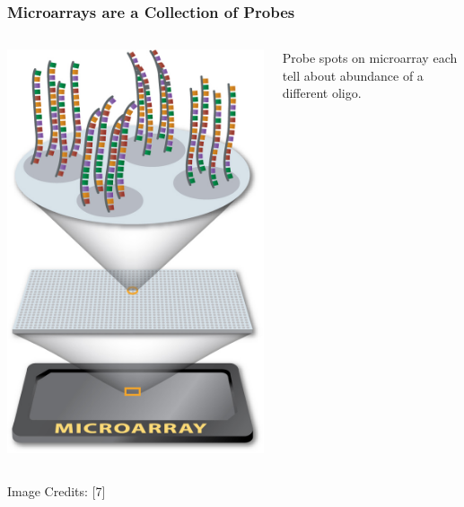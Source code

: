\documentclass{beamer}
\begin{document}
\begin{frame}
  \frametitle{Microarrays are a Collection of Probes}
  \begin{columns}
    \begin{column}{0.48\textwidth}
      \begin{center}
        \includegraphics[scale=.15]{mazoom.jpg}
      \end{center}
    \end{column}
    \begin{column}{0.48\textwidth}
        Probe spots on microarray each tell about abundance of a different oligo.

    \end{column}
  \end{columns}

  {\tiny Image Credits: [7]}
\end{frame}
\end{document}
